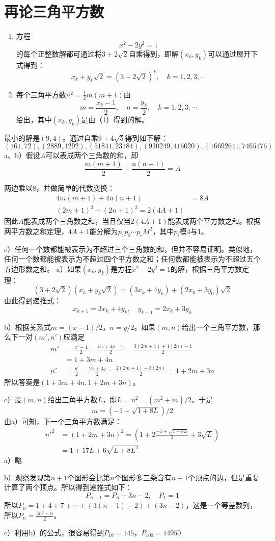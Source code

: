 \chapter{再论三角平方数}
\begin{theorem}[三角平方数定理]
\begin{enumerate}
\item 方程
\[x^2-2y^2=1\]
的每个正整数解都可通过将$3+2\sqrt2$自乘得到，即解$(x_k, y_k)$可以通过展开下式得到：
\[x_k+y_k\sqrt2=(3+2\sqrt2)^k,\quad k=1,2,3,\cdots\]
\item 每个三角平方数$n^2=\frac{1}{2}m(m+1)$由
\[m=\frac{x_k-1}{2},\quad n=\frac{y_k}{2},\quad k=1,2,3,\cdots\]
给出，其中$(x_k,y_k)$是由（1）得到的解。
\end{enumerate}
\end{theorem}
%
\exercise 最小的解是$(9, 4)$。通过自乘$9+4\sqrt5$得到如下解：
\[(161, 72),(2889, 1292),(51841, 23184),(930249, 416020),(16692641, 7465176)\]
%
\exercise a、b）假设$A$可以表成两个三角数的和，即
\[\frac{m(m+1)}{2}+\frac{n(n+1)}{2}=A\]\par
两边乘以8，并做简单的代数变换：
\begin{align*}
4m(m+1)+4n(n+1)&=8A \\
(2m+1)^2+(2n+1)^2=2(4A+1)
\end{align*}
因此$A$能表成两个三角数之和，当且仅当$2(4A+1)$能表成两个平方数之和。根据两平方数之和定理，$4A+1$能分解为$p_1p_2\cdots p_rM^2$，其中$p_i$模4与1。\par
c）任何一个数都能被表示为不超过三个三角数的和，但并不容易证明。类似地，任何一个数都能被表示为不超过四个平方数之和；任何数都能被表示为不超过五个五边形数之和。
%
\exercise a）如果$(x_k,y_k)$是方程$x^2-2y^2=1$的解，根据三角平方数定理：
\[(3+2\sqrt2)(x_k+y_k\sqrt2)=(3x_k+4y_k)+(2x_0+3y_0)\sqrt2\]
由此得到递推式：
\[x_{k+1}=3x_k+4y_k,\quad y_{k+1}=2x_k+3y_k\]\par
b）根据关系式$m=(x-1)/2$，$n=y/2$。如果$(m,n)$给出一个三角平方数，那么下一对$(m',n')$应满足
\begin{align*}
m'&=\frac{x'-1}{2}=\frac{3x+4y-1}{2}=\frac{3(2m+1)+4(2n)-1}{2} \\
&=1+3m+4n \\
n'&=\frac{y'}{2}=\frac{2x+3y}{2}=\frac{2(2m+1)+3(2n)}{2}=1+2m+3n
\end{align*}
所以答案是$(1+3m+4n,1+2m+3n)$。\par
c）设$(m,n)$给出三角平方数$L$，即$L=n^2=(m^2+m)/2$。于是
\[m=(-1+\sqrt{1+8L})/2\]
由a）可知，下一个三角平方数满足：
\begin{align*}
n'^2&=(1+2m+3n)^2=\left(1+2\frac{-1+\sqrt{1+8L}}{2}+3\sqrt{L}\right)\\
&=1+17L+6\sqrt{L+8L^2}
\end{align*}
%
\exercise a）略\par
b）观察发现第$n+1$个图形会比第$n$个图形多三条含有$n+1$个顶点的边，但是重复计算了两个顶点。所以得到递推式如下：
\[P_{n+1}=P_n+3n-2,\quad P_1=1\]
所以$P_n=1+4+7+\cdots + (3(n-1) -2) + (3n-2)$，这是一个等差数列，所以$P_n=\frac{3n^2-n}{2}$。\par
c）利用b）的公式，很容易得到$P_{10}=145$，$P_{100}=14950$
